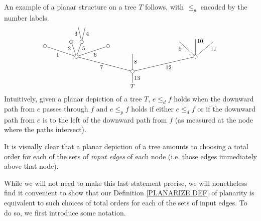 \documentclass[a4paper,10pt]{article}%
\begin{document}
\begin{example}\label{PLANAREX EX}
An example of a planar structure on a tree $T$ follows, with $\leq_p$ encoded by the number labels.
\[
	\begin{tikzpicture}[grow=up,auto,level distance=2.1em,
	every node/.style = {font=\footnotesize,inner sep=2pt},
	dummy/.style={circle,draw,inner sep=0pt,minimum size=1.75mm}]
		\node at (0,0) {$T$}
			child{node [dummy] {}
				child[sibling distance = 9em]{node [dummy] {}
					child[sibling distance = 2.5em]{
					edge from parent node [near end,swap] {$11$}}
					child[level distance=2.5em]{
					edge from parent node [very near end,swap] {$10$}}				
					child[sibling distance = 2.3em]{
					edge from parent node [near end] {$9$}}
				edge from parent node [swap] {12}}
				child[level distance =2.5em]{
				edge from parent node [swap] {$8$}}
				child[sibling distance = 8em]{node [dummy] {}
					child[sibling distance =3em, level distance = 1.5 em]{node [dummy] {}
					edge from parent node [swap] {$6$}}
					child[sibling distance = 1.5em]{node [dummy] {}
						child[sibling distance =1em]{
						edge from parent node [swap,near end] {$4$}}
						child[sibling distance =1em]{
						edge from parent node [near end] {$3$}}
					edge from parent node [very near end,swap] {$5$}}
					child[sibling distance =1.5em]{node [dummy] {}
					edge from parent node [very near end] {$2$}}
					child[sibling distance =3em,level distance =1.5em]{node [dummy] {}
					edge from parent node {$1$}}
				edge from parent node {$7$}}
			edge from parent node [swap] {$13$}};
	\end{tikzpicture}
\]
Intuitively, given a planar depiction of a tree $T$, $e \leq_d f$ holds when the downward path from $e$ passes through $f$
and $e \leq_p f$ holds if either
$e \leq_d f$ or if the downward path from $e$ is to the left of the downward path from $f$ (as measured at the node where the paths intersect).
\end{example}

It is visually clear that a planar depiction of a tree amounts to choosing a total order for each of the sets of \textit{input edges} of each node (i.e. those edges immediately above that node).

While we will not need to make this last statement precise, we will nonetheless find it convenient to show that our Definition \ref{PLANARIZE DEF} of planarity is equivalent to such choices of total orders for each of the sets of input edges.
To do so, we first introduce some notation.
\end{document}

